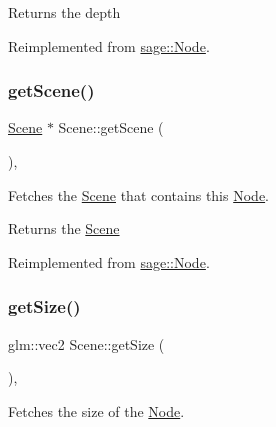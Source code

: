 \begin{DoxyReturn}{Returns}
the depth 
\end{DoxyReturn}


Reimplemented from \mbox{\hyperlink{classsage_1_1Node_a303fffee8f70d39603b3a4e251e2e820}{sage\+::\+Node}}.

\mbox{\label{classsage_1_1Scene_ab09415b375ad054825e9fd4d4e471c6b}} 
\subsubsection{\texorpdfstring{getScene()}{getScene()}}
{\footnotesize\ttfamily \mbox{\hyperlink{classsage_1_1Scene}{Scene}} $\ast$ Scene\+::get\+Scene (\begin{DoxyParamCaption}{ }\end{DoxyParamCaption})\hspace{0.3cm}{\ttfamily [override]}, {\ttfamily [virtual]}}



Fetches the \mbox{\hyperlink{classsage_1_1Scene}{Scene}} that contains this \mbox{\hyperlink{classsage_1_1Node}{Node}}. 

\begin{DoxyReturn}{Returns}
the \mbox{\hyperlink{classsage_1_1Scene}{Scene}} 
\end{DoxyReturn}


Reimplemented from \mbox{\hyperlink{classsage_1_1Node_a22d0dfa466965da0324d47d22eb24e6b}{sage\+::\+Node}}.

\mbox{\label{classsage_1_1Scene_a00e53fc54466062ecc1437b980f5fa69}} 
\subsubsection{\texorpdfstring{getSize()}{getSize()}}
{\footnotesize\ttfamily glm\+::vec2 Scene\+::get\+Size (\begin{DoxyParamCaption}{ }\end{DoxyParamCaption})\hspace{0.3cm}{\ttfamily [override]}, {\ttfamily [virtual]}}



Fetches the size of the \mbox{\hyperlink{classsage_1_1Node}{Node}}. 

